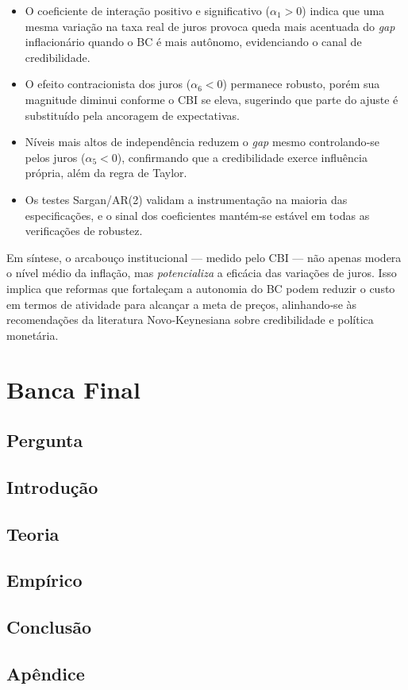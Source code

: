 \documentclass[a4paper,12pt]{article}[abnt2]
\begin{document}
\begin{itemize}
  \item O coeficiente de interação positivo e significativo
        (\(\alpha_{1}>0\)) indica que uma mesma variação na taxa real de juros
        provoca queda mais acentuada do \textit{gap} inflacionário quando o
        BC é mais autônomo, evidenciando o canal de credibilidade.
  \item O efeito contracionista dos juros (\(\alpha_{6}<0\)) permanece
        robusto, porém sua magnitude diminui conforme o CBI se eleva,
        sugerindo que parte do ajuste é substituído pela ancoragem de
        expectativas.
  \item Níveis mais altos de independência reduzem o \textit{gap} mesmo
        controlando‑se pelos juros (\(\alpha_{5}<0\)), confirmando que a
        credibilidade exerce influência própria, além da regra de Taylor.
  \item Os testes Sargan/AR(2) validam a instrumentação na maioria das
        especificações, e o sinal dos coeficientes mantém‑se estável em todas
        as verificações de robustez.
\end{itemize}

\noindent
Em síntese, o arcabouço institucional — medido pelo CBI — não apenas
modera o nível médio da inflação, mas \emph{potencializa} a eficácia das
variações de juros. Isso implica que reformas que fortaleçam a autonomia do
BC podem reduzir o custo em termos de atividade para alcançar a meta de
preços, alinhando‑se às recomendações da literatura Novo‑Keynesiana sobre
credibilidade e política monetária.

\newpage
\section{\textbf{Banca Final}}
\subsection{\textbf{Pergunta}}
\subsection{\textbf{Introdução}}
\subsection{\textbf{Teoria}}
\subsection{\textbf{Empírico}}
\subsection{\textbf{Conclusão}}
\subsection{\textbf{Apêndice}}

\newpage
\printbibliography
\end{document}
